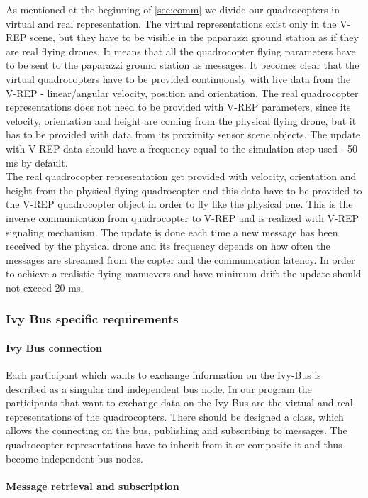 As mentioned at the beginning of \ref{sec:comm} we divide our quadrocopters in virtual and real representation. The virtual representations exist only in the V-REP scene, but they have to be visible in the paparazzi ground station as if they are real flying drones. It means that all the quadrocopter flying parameters have to be sent to the paparazzi ground station as messages. It becomes clear that the virtual quadrocopters have to be provided continuously with live data from the V-REP - linear/angular velocity, position and orientation. The real quadrocopter representations does not need to be provided with V-REP parameters, since its velocity, orientation and height are coming from the physical flying drone, but it has to be provided with data from its proximity sensor scene objects. The update with V-REP data should have a frequency equal to the simulation step used - 50 ms by default.\\
The real quadrocopter representation get provided with velocity, orientation and height from the physical flying quadrocopter and this data have to be provided to the V-REP quadrocopter object in order to fly like the physical one. This is the inverse communication from quadrocopter to V-REP and is realized with V-REP signaling mechanism. The update is done each time a new message has been received by the physical drone and its frequency depends on how often the messages are streamed from the copter and the communication latency. In order to achieve a realistic flying manuevers and have minimum drift the update should not exceed 20 ms.

\subsubsection{Ivy Bus specific requirements}
\label{sec:requirementsIVYBus}
\paragraph{Ivy Bus connection}
Each participant which wants to exchange information on the Ivy-Bus is described as a singular and independent bus node. In our program the participants that want to exchange data on the Ivy-Bus are the virtual and real representations of the quadrocopters. There should be designed a class, which allows the connecting on the bus, publishing and subscribing to messages. The quadrocopter representations have to inherit from it or composite it and thus become independent bus nodes.

\paragraph{Message retrieval and subscription}
\label{par:messageRetrieval}


